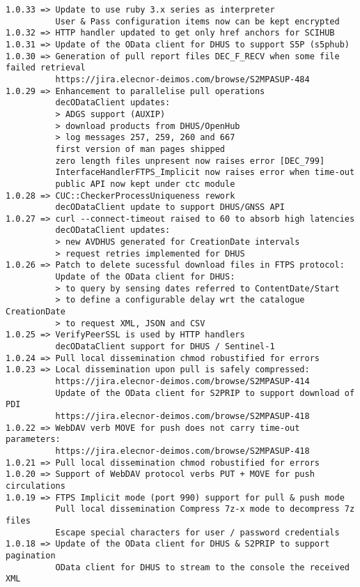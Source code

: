 \documentclass[dec_sum_main.tex]{subfiles}
\begin{document}
\begin{Verbatim}[tabsize=4]
1.0.33 => Update to use ruby 3.x series as interpreter
          User & Pass configuration items now can be kept encrypted
1.0.32 => HTTP handler updated to get only href anchors for SCIHUB
1.0.31 => Update of the OData client for DHUS to support S5P (s5phub)
1.0.30 => Generation of pull report files DEC_F_RECV when some file failed retrieval
          https://jira.elecnor-deimos.com/browse/S2MPASUP-484
1.0.29 => Enhancement to parallelise pull operations
          decODataClient updates:
          > ADGS support (AUXIP)
          > download products from DHUS/OpenHub
          > log messages 257, 259, 260 and 667
          first version of man pages shipped
          zero length files unpresent now raises error [DEC_799]
          InterfaceHandlerFTPS_Implicit now raises error when time-out 
          public API now kept under ctc module
1.0.28 => CUC::CheckerProcessUniqueness rework
          decODataClient update to support DHUS/GNSS API
1.0.27 => curl --connect-timeout raised to 60 to absorb high latencies
          decODataClient updates:
          > new AVDHUS generated for CreationDate intervals
          > request retries implemented for DHUS
1.0.26 => Patch to delete sucessful download files in FTPS protocol:
          Update of the OData client for DHUS:
          > to query by sensing dates referred to ContentDate/Start
          > to define a configurable delay wrt the catalogue CreationDate
          > to request XML, JSON and CSV
1.0.25 => VerifyPeerSSL is used by HTTP handlers
          decODataClient support for DHUS / Sentinel-1
1.0.24 => Pull local dissemination chmod robustified for errors
1.0.23 => Local dissemination upon pull is safely compressed:
          https://jira.elecnor-deimos.com/browse/S2MPASUP-414
          Update of the OData client for S2PRIP to support download of PDI
          https://jira.elecnor-deimos.com/browse/S2MPASUP-418
1.0.22 => WebDAV verb MOVE for push does not carry time-out parameters:
          https://jira.elecnor-deimos.com/browse/S2MPASUP-418
1.0.21 => Pull local dissemination chmod robustified for errors
1.0.20 => Support of WebDAV protocol verbs PUT + MOVE for push circulations
1.0.19 => FTPS Implicit mode (port 990) support for pull & push mode
          Pull local dissemination Compress 7z-x mode to decompress 7z files
          Escape special characters for user / password credentials
1.0.18 => Update of the OData client for DHUS & S2PRIP to support pagination
          OData client for DHUS to stream to the console the received XML

\end{Verbatim}
\end{document}
